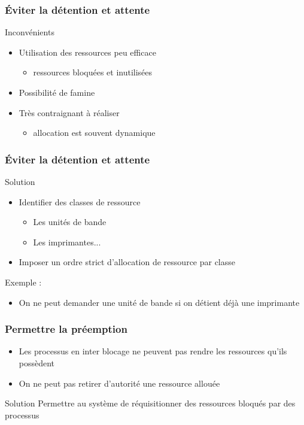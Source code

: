 \begin{frame}
\frametitle{Éviter la détention et attente}
\begin{block}{Inconvénients}
\begin{itemize}
\item Utilisation des ressources peu efficace
\begin{itemize}
\item ressources bloquées et inutilisées
\end{itemize}
\item Possibilité de famine
\item Très contraignant à réaliser
\begin{itemize}
\item allocation est souvent dynamique
\end{itemize}
\end{itemize}
\end{block}
\end{frame}

\begin{frame}
\frametitle{Éviter la détention et attente}
\begin{block}{Solution}
\begin{itemize}
\item Identifier des classes de ressource
\begin{itemize}
\item Les unités de bande
\item Les imprimantes...
\end{itemize}
\item Imposer un ordre strict d’allocation de ressource par classe
\end{itemize}
\end{block}

Exemple :
\begin{itemize}
\item On ne peut demander une unité de bande si on détient déjà une imprimante
\end{itemize}
\end{frame}

\begin{frame}
\frametitle{Permettre la préemption}
\begin{itemize}
\item Les processus en inter blocage ne peuvent pas rendre les ressources qu’ils possèdent
\item On ne peut pas retirer d'autorité une ressource allouée
\end{itemize}
\begin{block}{Solution}
Permettre au système de réquisitionner des ressources bloqués par des processus
\end{block}
\end{frame}

